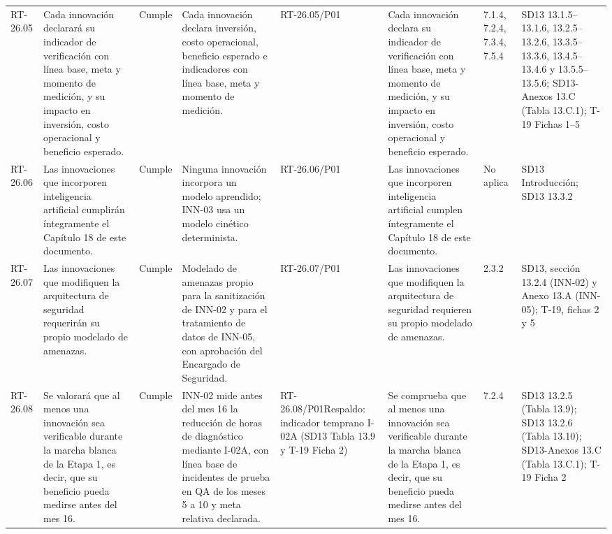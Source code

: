 \documentclass[oficio,firma,final]{lafrox}
\begin{document}
\begin{landscape}
{\begin{longtable}{@{}F{0.054} F{0.173} F{0.061} F{0.191} F{0.106} F{0.180} F{0.067} F{0.168}@{}}
  RT-26.05 & Cada innovación declarará su indicador de verificación con línea base, meta y momento de medición, y su impacto en inversión, costo operacional y beneficio esperado. & Cumple & Cada innovación declara inversión, costo operacional, beneficio esperado e indicadores con línea base, meta y momento de medición. & RT-26.05/\allowbreak{}P01 & Cada innovación declara su indicador de verificación con línea base, meta y momento de medición, y su impacto en inversión, costo operacional y beneficio esperado. & 7.1.4, 7.2.4, 7.3.4, 7.5.4 & SD13 13.1.5–13.1.6, 13.2.5–13.2.6, 13.3.5–13.3.6, 13.4.5–13.4.6 y 13.5.5–13.5.6; SD13-Anexos 13.C (Tabla 13.C.1); T-19 Fichas 1–5  \\
  RT-26.06 & Las innovaciones que incorporen inteligencia artificial cumplirán íntegramente el Capítulo 18 de este documento. & Cumple & Ninguna innovación incorpora un modelo aprendido; INN-03 usa un modelo cinético determinista. & RT-26.06/\allowbreak{}P01 & Las innovaciones que incorporen inteligencia artificial cumplen íntegramente el Capítulo 18 de este documento. & No aplica & SD13 Introducción; SD13 13.3.2  \\
  RT-26.07 & Las innovaciones que modifiquen la arquitectura de seguridad requerirán su propio modelado de amenazas. & Cumple & Modelado de amenazas propio para la sanitización de INN-02 y para el tratamiento de datos de INN-05, con aprobación del Encargado de Seguridad. & RT-26.07/\allowbreak{}P01 & Las innovaciones que modifiquen la arquitectura de seguridad requieren su propio modelado de amenazas. & 2.3.2 & SD13, sección 13.2.4 (INN-02) y Anexo 13.A (INN-05); T-19, fichas 2 y 5  \\
  RT-26.08 & Se valorará que al menos una innovación sea verificable durante la marcha blanca de la Etapa 1, es decir, que su beneficio pueda medirse antes del mes 16. & Cumple & INN-02 mide antes del mes 16 la reducción de horas de diagnóstico mediante I-02A, con línea base de incidentes de prueba en QA de los meses 5 a 10 y meta relativa declarada. & RT-26.08/\allowbreak{}P01\newline Respaldo: indicador temprano I-02A (SD13 Tabla 13.9 y T-19 Ficha 2) & Se comprueba que al menos una innovación sea verificable durante la marcha blanca de la Etapa 1, es decir, que su beneficio pueda medirse antes del mes 16. & 7.2.4 & SD13 13.2.5 (Tabla 13.9); SD13 13.2.6 (Tabla 13.10); SD13-Anexos 13.C (Tabla 13.C.1); T-19 Ficha 2  \\
\end{longtable}}
\end{landscape}
\end{document}
